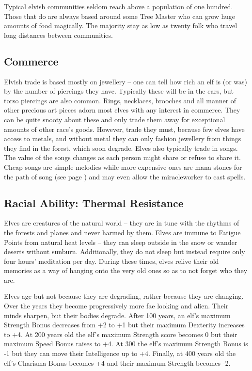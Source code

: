 \documentclass[titlepage,a4paper,openany]{book}
\begin{document}
\begin{multicols}{2}
Typical elvish communities seldom reach above a population of one hundred. Those that do are always based around some Tree Master who can grow huge amounts of food magically. The majority stay as low as twenty folk who travel long distances between communities.

\subsection{Commerce}

Elvish trade is based mostly on jewellery -- one can tell how rich an elf is (or was) by the number of piercings they have. Typically these will be in the ears, but torso piercings are also common. Rings, necklaces, brooches and all manner of other precious art pieces adorn most elves with any interest in commerce. They can be quite snooty about these and only trade them away for exceptional amounts of other race's goods. However, trade they must, because few elves have access to metals, and without metal they can only fashion jewellery from things they find in the forest, which soon degrade. Elves also typically trade in songs. The value of the songs changes as each person might share or refuse to share it. Cheap songs are simple melodies while more expensive ones are mana stones for the path of song (see page \pageref{song}) and may even allow the \gls{miracleworker} to cast spells.

\subsection{Racial Ability: Thermal Resistance}

Elves are creatures of the natural world -- they are in tune with the rhythms of the forests and planes and never harmed by them. Elves are immune to Fatigue Points from natural heat levels -- they can sleep outside in the snow or wander deserts without sunburn. Additionally, they do not sleep but instead require only four hours' meditation per day. During these times, elves relive their old memories as a way of hanging onto the very old ones so as to not forget who they are.

Elves age but not because they are degrading, rather because they are changing. Over the years they become progressively more fae looking and alien. Their minds sharpen, but their bodies degrade. After 100 years, an elf's maximum Strength Bonus decreases from +2 to +1 but their maximum Dexterity increases to +4. At 200 years old the elf's maximum Strength score becomes 0 but their maximum Speed Bonus raises to +4. At 300 the elf's maximum Strength Bonus is -1 but they can move their Intelligence up to +4. Finally, at 400 years old the elf's Charisma Bonus becomes +4 and their maximum Strength becomes -2.


\end{multicols}
\end{document}
